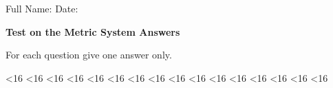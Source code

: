 \documentclass{./units4school}
\begin{document}
Full Name: %
\raisebox{-2pt}{\rule[-.4ex]{5cm}{.4pt}}\hfill%
Date: %
\raisebox{-2pt}{\rule[-.4ex]{3cm}{.4pt}}
\hspace*{.5cm}%


\vspace{6mm}
\textbf{\large Test on the Metric System \ifprintanswers \hfill \textcolor{AccentColor}{Answers}
\fi
}%
\vspace{3mm}

For each question give one answer only.








\ifnum\theexerciseID<16 {} \fi
\ifnum\theexerciseID<16 {} \fi
\ifnum\theexerciseID<16 {} \fi
\ifnum\theexerciseID<16 {} \fi
\ifnum\theexerciseID<16 {} \fi
\ifnum\theexerciseID<16 {} \fi
\ifnum\theexerciseID<16 {} \fi
\ifnum\theexerciseID<16 {} \fi
\ifnum\theexerciseID<16 {} \fi
\ifnum\theexerciseID<16 {} \fi
\ifnum\theexerciseID<16 {} \fi
\ifnum\theexerciseID<16 {} \fi
\ifnum\theexerciseID<16 {} \fi
\ifnum\theexerciseID<16 {} \fi
\ifnum\theexerciseID<16 {} \fi
\ifnum\theexerciseID<16 {} \fi
%
\end{document}

